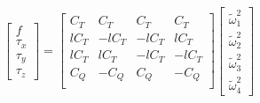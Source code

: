 \documentclass{article}
\begin{document}
		\begin{equation}
			\begin{bmatrix}f \\ \tau_x \\ \tau_y \\ \tau_z \end{bmatrix} = 
			\begin{bmatrix}
				C_T & C_T & C_T & C_T \\ 
				lC_T & -lC_T & -lC_T & lC_T \\
				lC_T & lC_T & -lC_T & -lC_T \\
				C_Q & -C_Q & C_Q & -C_Q \\ 
			\end{bmatrix}
			\begin{bmatrix} \tilde{\omega}_1^2 \\ \tilde{\omega}_2^2 \\ \tilde{\omega}_3^2 \\ \tilde{\omega}_4^2 \end{bmatrix}
		\end{equation}
	
	\newpage
	
	
\end{document}
